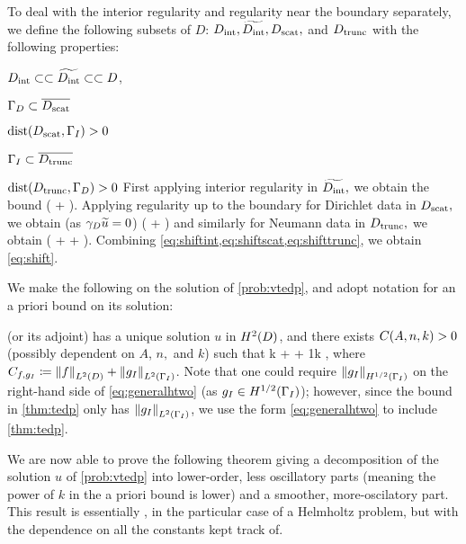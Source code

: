 To deal with the interior regularity and regularity near the boundary separately, we define the following subsets of $D$: $D_{\mathrm{int}},\widetilde{D_{\mathrm{int}}},D_{\mathrm{scat}},$ and $D_{\mathrm{trunc}}$ with the following properties:
\bit
\item $D_{\mathrm{int}} \subset\subset \widetilde{D_{\mathrm{int}}} \subset\subset D$,
\item $\Gamma_{D} \subset \overline{D_{\mathrm{scat}}}$
\item $\operatorname{dist}(D_{\mathrm{scat}},\Gamma_{I}) > 0 $
  \item $\Gamma_{I} \subset \overline{D_{\mathrm{trunc}}}$
\item $\operatorname{dist}(D_{\mathrm{trunc}},\Gamma_{D}) > 0 $
    \eit
    First applying interior regularity \cite[Theorem 4.16]{Mc:00} in $\widetilde{D_{\mathrm{int}}},$ we obtain the bound
    \beq\label{eq:shiftint}
\NHlptDint{\utilde} \leq \CintAl \mleft(\NHoDinttilde{\utilde} + \NHlDinttilde{\ftilde}\mright).
\eeq
Applying regularity up to the boundary for Dirichlet data \cite[Theorem 4.18 (i)]{Mc:00} in $D_{\mathrm{scat}},$ we obtain (as $\gamma_{D} \widetilde{u} = 0$)
\beq\label{eq:shiftscat}
\NHlptDscat{\utilde} \leq \CscatAl \mleft(\NHoD{\utilde} + \NHlD{\ftilde}\mright)
\eeq
and similarly for Neumann data \cite[Theorem 4.18 (ii)]{Mc:00} in $D_{\mathrm{trunc}},$ we obtain
\beq\label{eq:shifttrunc}
\NHlptDtrunc{\utilde} \leq \CtruncAl \mleft(\NHoD{\utilde} + \NHlphGI{\dn \utilde} + \NHlD{\ftilde}\mright).
\eeq
Combining \cref{eq:shiftint,eq:shiftscat,eq:shifttrunc}, we obtain \cref{eq:shift}.
\epf

We make the following  on the solution of \cref{prob:vtedp}, and adopt notation for an a priori bound on its solution:

\bas\label{ass:htwo}
 (or its adjoint) has a unique solution $u$ in $\HtD$, and there exists $\CAnk>0$ (possibly dependent on $A$, $n,$ and $k$) such that
\beq\label{eq:generalhtwo}
k  +  + \frac1k  \leq \CAnk \Cfg,
\eeq
where $\Cfg \de \NLtD{f} + \NLtGI{\gI}$.
\eas
Note that one could require $\NHhGI{\gI}$ on the right-hand side of \cref{eq:generalhtwo} (as $\gI \in \HhGI$); however, since the bound in \cref{thm:tedp} only has $\NLtGI{\gI}$, we use the form \cref{eq:generalhtwo} to include \cref{thm:tedp}.

We are now able to prove the following theorem giving a decomposition of the solution $u$ of \cref{prob:vtedp} into lower-order, less oscillatory parts (meaning the power of $k$ in the a priori bound is lower) and a smoother, more-oscilatory part. This result is essentially \cite[Theorem 1]{ChNi:18a}, in the particular case of a Helmholtz problem, but with the dependence on all the constants kept track of.

